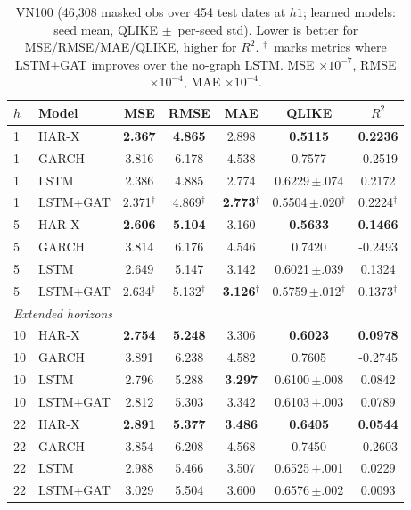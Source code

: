 \documentclass[runningheads]{llncs}
\begin{document}
\begin{table}[t]
\centering
\caption{VN100 (46{,}308 masked obs over 454 test dates at $h1$; learned models: seed mean, QLIKE
$\pm$~per-seed std). Lower is better for MSE/RMSE/MAE/QLIKE, higher for $R^2$. $^{\dagger}$~marks metrics where LSTM+GAT improves over the no-graph LSTM. MSE $\times10^{-7}$, RMSE $\times10^{-4}$, MAE $\times10^{-4}$.}
\label{tab:vn100}
\footnotesize
\setlength{\tabcolsep}{5pt}
\begin{tabular}{llccccc}
\toprule
$h$ & Model & MSE & RMSE & MAE & QLIKE & $R^2$ \\
\midrule
1  & HAR-X    & \textbf{2.367} & \textbf{4.865} & 2.898 & \textbf{0.5115} & \textbf{0.2236} \\
1  & GARCH    & 3.816 & 6.178 & 4.538 & 0.7577 & -0.2519 \\
1  & LSTM     & 2.386 & 4.885 & 2.774 & 0.6229\,$\pm$.074 & 0.2172 \\
1  & LSTM+GAT & 2.371$^{\dagger}$ & 4.869$^{\dagger}$ & \textbf{2.773}$^{\dagger}$ & 0.5504\,$\pm$.020$^{\dagger}$ & 0.2224$^{\dagger}$ \\
\midrule
5  & HAR-X    & \textbf{2.606} & \textbf{5.104} & 3.160 & \textbf{0.5633} & \textbf{0.1466} \\
5  & GARCH    & 3.814 & 6.176 & 4.546 & 0.7420 & -0.2493 \\
5  & LSTM     & 2.649 & 5.147 & 3.142 & 0.6021\,$\pm$.039 & 0.1324 \\
5  & LSTM+GAT & 2.634$^{\dagger}$ & 5.132$^{\dagger}$ & \textbf{3.126}$^{\dagger}$ & 0.5759\,$\pm$.012$^{\dagger}$ & 0.1373$^{\dagger}$ \\
\midrule
\multicolumn{7}{l}{\emph{Extended horizons}}\\
10 & HAR-X    & \textbf{2.754} & \textbf{5.248} & 3.306 & \textbf{0.6023} & \textbf{0.0978} \\
10 & GARCH    & 3.891 & 6.238 & 4.582 & 0.7605 & -0.2745 \\
10 & LSTM     & 2.796 & 5.288 & \textbf{3.297} & 0.6100\,$\pm$.008 & 0.0842 \\
10 & LSTM+GAT & 2.812 & 5.303 & 3.342 & 0.6103\,$\pm$.003 & 0.0789 \\
\midrule
22 & HAR-X    & \textbf{2.891} & \textbf{5.377} & \textbf{3.486} & \textbf{0.6405} & \textbf{0.0544} \\
22 & GARCH    & 3.854 & 6.208 & 4.568 & 0.7450 & -0.2603 \\
22 & LSTM     & 2.988 & 5.466 & 3.507 & 0.6525\,$\pm$.001 & 0.0229 \\
22 & LSTM+GAT & 3.029 & 5.504 & 3.600 & 0.6576\,$\pm$.002 & 0.0093 \\
\bottomrule
\end{tabular}
\end{table}
\end{document}
